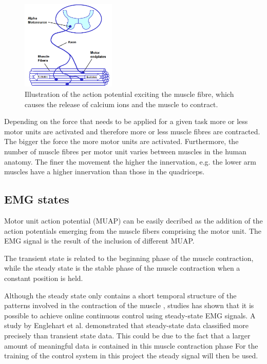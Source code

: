 \begin{figure}[H]
	\includegraphics[width=0.4\textwidth]{figures/Anatomy/EMG_generation}  %
	\caption{Illustration of the action potential exciting the muscle fibre, which causes the release of calcium ions and the muscle to contract. \cite{konrad2005}}
	\label{fig:EMG_generation}  %
\end{figure}

Depending on the force that needs to be applied for a given task more or less motor units are activated and therefore more or less muscle fibres are contracted. The bigger the force the more motor units are activated. Furthermore, the number of muscle fibres per motor unit varies between muscles in the human anatomy. The finer the movement the higher the innervation, e.g. the lower arm muscles have a higher innervation than those in the quadriceps. \cite{cram2012}

\subsection{EMG states}
Motor unit action potential (MUAP) can be easily decribed as the addition of the action potentials emerging from the muscle fibers comprising the motor unit. The EMG signal is the result of the inclusion of different MUAP.

 The transient state is related to the beginning phase of the muscle contraction, while the steady state is the stable phase of the muscle contraction when a constant position is held. \cite{mobarak2014}

Although the steady state only contains a short temporal structure of the patterns involved in the contraction of the muscle \cite{mobarak}, studies has shown that it is possible to achieve online continuous control using steady-state EMG signals. A study by Englehart et al. \cite{} demonstrated that steady-state data classified more precisely than transient state data. This could be due to the fact that a larger amount of meaningful data is contained in this muscle contraction phase \cite{mobarak} For the training of the control system  in this project the steady signal will then be used. %

